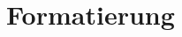 \documentclass[a4paper, 10pt, fleqn]{article}
\begin{document}
\section{Formatierung}

\end{document}
